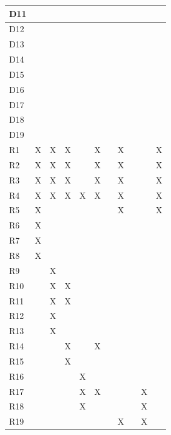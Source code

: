 \documentclass{article}
\begin{document}
\begin{longtable}[c]{|m{0.15cm}|m{0.15cm}|m{0.15cm}|m{0.15cm}|m{0.15cm}|m{0.15cm}|m{0.15cm}|m{0.15cm}|m{0.15cm}|m{0.15cm}|m{0.15cm}|}
 \hline
 D11 &   &   &   &   &   &   &   &   &   &   \\
 \hline
 D12 &   &   &   &   &   &   &   &   &   &   \\
 \hline
 D13 &   &   &   &   &   &   &   &   &   &   \\
 \hline
 D14 &   &   &   &   &   &   &   &   &   &   \\
 \hline
 D15 &   &   &   &   &   &   &   &   &   &   \\
 \hline
 D16 &   &   &   &   &   &   &   &   &   &   \\
 \hline
 D17 &   &   &   &   &   &   &   &   &   &   \\
 \hline
 D18 &   &   &   &   &   &   &   &   &   &   \\
 \hline
 D19 &   &   &   &   &   &   &   &   &   &   \\
 \hline
 R1 & X & X & X &   & X &   & X &   &   & X \\
 \hline
 R2 & X & X & X &   & X &   & X &   &   & X \\
 \hline
 R3 & X & X & X &   & X &   & X &   &   & X \\
 \hline
 R4 & X & X & X & X & X &   & X &   &   & X \\
 \hline
 R5 & X &   &   &   &   &   & X &   &   & X \\
 \hline
 R6 & X &   &   &   &   &   &   &   &   &   \\
 \hline
 R7 & X &   &   &   &   &   &   &   &   &   \\
 \hline
 R8 & X &   &   &   &   &   &   &   &   &   \\
 \hline
 R9 &   & X &   &   &   &   &   &   &   &   \\
 \hline
 R10 &   & X & X &   &   &   &   &   &   &   \\
 \hline
 R11 &   & X & X &   &   &   &   &   &   &   \\
 \hline
 R12 &   & X &   &   &   &   &   &   &   &   \\
 \hline
 R13 &   & X &   &   &   &   &   &   &   &   \\
 \hline
 R14 &   &   & X &   & X &   &   &   &   &   \\
 \hline
 R15 &   &   & X &   &   &   &   &   &   &   \\
 \hline
 R16 &   &   &   & X &   &   &   &   &   &   \\
 \hline
 R17 &   &   &   & X & X &   &   &   & X &   \\
 \hline
 R18 &   &   &   & X &   &   &   &   & X &   \\
 \hline
 R19 &   &   &   &   &   &   & X &   & X &   \\

\end{longtable}
\end{document}
